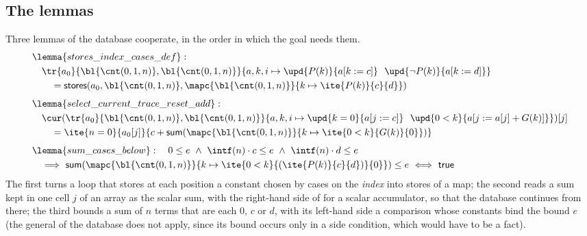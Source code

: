\subsection{The lemmas}
Three lemmas of the database cooperate, in the order in which the goal needs them.
\begin{align*}
  &\lemma{stores\_index\_cases\_def}:\\
  &\quad \tr{a_0}{\bl{\cnt(0, 1, n)}, \bl{\cnt(0, 1, n)}}{a, k, i \mapsto \upd{P(k)}{a[k := c]}\ \ \upd{\neg P(k)}{a[k := d]}}\\
  &\qquad = \mathsf{stores}(a_0, \bl{\cnt(0, 1, n)}, \mapc{\bl{\cnt(0, 1, n)}}{k \mapsto \ite{P(k)}{c}{d}})\\[4pt]
  &\lemma{select\_current\_trace\_reset\_add}:\\
  &\quad \cur(\tr{a_0}{\bl{\cnt(0, 1, n)}, \bl{\cnt(0, 1, n)}}{a, k, i \mapsto \upd{k = 0}{a[j := c]}\ \ \upd{0 < k}{a[j := a[j] + G(k)]}})[j]\\
  &\qquad = \ite{n = 0}{a_0[j]}{c + \mathsf{sum}(\mapc{\bl{\cnt(0, 1, n)}}{k \mapsto \ite{0 < k}{G(k)}{0}})}\\[4pt]
  &\lemma{sum\_cases\_below}:\quad 0 \le e\ \wedge\ \intf(n) \cdot c \le e\ \wedge\ \intf(n) \cdot d \le e\\
  &\quad\Longrightarrow\ \mathsf{sum}(\mapc{\bl{\cnt(0, 1, n)}}{k \mapsto \ite{0 < k}{(\ite{P(k)}{c}{d})}{0}}) \le e\ \Longleftrightarrow\ \mathsf{true}
\end{align*}
The first turns a loop that stores at each position a constant chosen by cases on the \emph{index} into
stores of a map; the second reads a sum kept in one cell $j$ of an array as the scalar sum, with the
right-hand side of  for a scalar accumulator, so that the database continues
from there; the third bounds a sum of $n$ terms that are each $0$, $c$ or $d$, with its left-hand side a
comparison whose constants bind the bound $e$ (the general  of the database does not
apply, since its bound occurs only in a side condition, which would have to be a fact).


